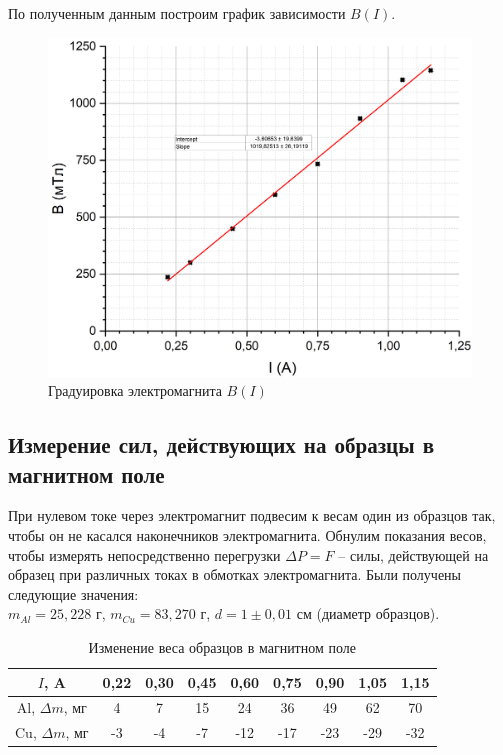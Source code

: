 \documentclass[a4paper, 12pt]{article}
\begin{document}
	По полученным данным построим график зависимости $ B(I)$.
	
	\begin{figure}[h!]
		\centering
		\includegraphics[width = \textwidth]{Graduation}
		\caption{Градуировка электромагнита $B(I)$}
	\end{figure}
	
	\subsection*{Измерение сил, действующих на образцы в магнитном поле}
	
	При нулевом токе через электромагнит подвесим к весам один из образцов так, чтобы он не касался наконечников электромагнита. Обнулим показания весов, чтобы измерять непосредственно перегрузки $ \Delta P = F $ -- силы, действующей на образец при различных токах в обмотках электромагнита. Были получены следующие значения:\\
	$m_{Al} = 25,228$ г, $m_{Cu} = 83,270$ г, $d = 1 \pm 0,01$ см (диаметр образцов). 
	\begin{table}[h!]
		\centering
		\begin{tabular}{|c|c|c|c|c|c|c|c|c|}
			\hline
			$I$, A & 0,22 & 0,30 & 0,45 & 0,60 & 0,75 & 0,90 & 1,05 & 1,15 \\ \hline
			Al, $\Delta m$, мг & 4 & 7 & 15 & 24 & 36 & 49 & 62 & 70 \\ \hline
			Cu, $\Delta m$, мг & -3 & -4 & -7 & -12 & -17 & -23 & -29 & -32 \\ \hline
		\end{tabular}
		\caption{Изменение веса образцов в магнитном поле}
	\end{table}
	
\end{document}
